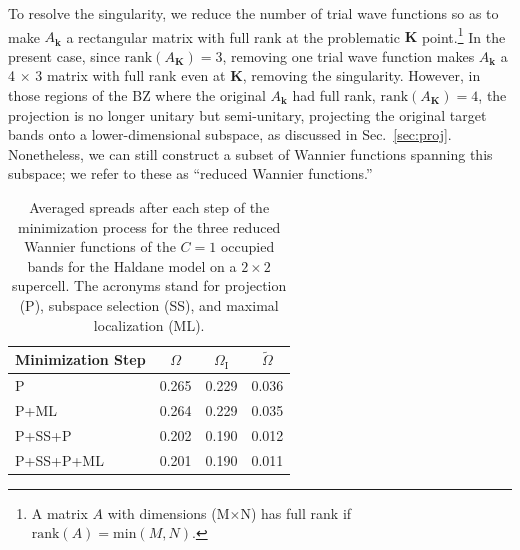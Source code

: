 \documentclass[galley,aps,pra,10pt,amsmath,amssymb,
    superscriptaddress,nofootinbib,longbibliography]{revtex4-2}
\newcounter{comm}
\newcommand{\sref}[1]{Sec.~\ref{sec:#1}}
\begin{document}
To resolve the singularity, we reduce the number of trial wave functions so as to make $A_{\mathbf{k}}$ a rectangular matrix with full rank at the problematic $\mathbf{K}$ point.\footnote{A matrix $A$ with dimensions (M$\times$N) has full rank if $\text{rank}(A) = \text{min}(M, N)$.} In the present case, since $\text{rank}(A_{\mathbf{K}})=3$, removing one trial wave function makes $A_{\mathbf{k}}$ a 4 $\times$ 3 matrix with full rank even at $\mathbf{K}$, removing the singularity. However, in those regions of the BZ where the original $A_{\mathbf{k}}$ had full rank, $\text{rank}(A_{\mathbf{K}})=4$, the projection is no longer unitary but semi-unitary, projecting the original target bands onto a lower-dimensional subspace, as discussed in \sref{proj}. Nonetheless, we can still construct a subset of Wannier functions spanning this subspace; we refer to these as “reduced Wannier functions.”


\newcommand\Tstrut{\rule{0pt}{2.9ex}}  %
\newcommand\Bstrut{\rule[-1.2ex]{0pt}{0pt}} %
\begin{table}[t!]
    \centering
    \begin{ruledtabular}
    \begin{tabular}{lccc}
    Minimization Step & $\Omega$ & $\Omega_\textrm{I}$ &  $\widetilde{\Omega}$  \\
     \hline \Tstrut
     P & 0.265 & 0.229 & 0.036 \\
     P+ML & 0.264 & 0.229 & 0.035  \\
     P+SS+P & 0.202 & 0.190 & 0.012 \\
     P+SS+P+ML & 0.201 & 0.190 & 0.011
    \end{tabular}
    \end{ruledtabular}
    \caption{Averaged spreads after each step of the minimization process for the three reduced Wannier functions of the $C=1$ occupied bands for the Haldane model on a $2\times 2$ supercell. The acronyms stand for projection (P), subspace selection (SS), and maximal localization (ML).} 
    \label{tab:spreads}
\end{table}
\end{document}
